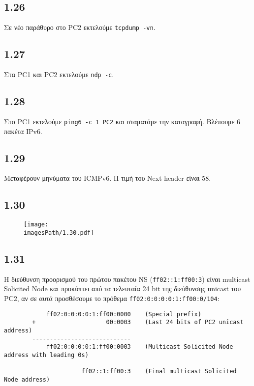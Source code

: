 \documentclass[a4paper, 12pt]{article}
\newcommand{\imagesPath}{.}
\begin{document}
	\subsection*{1.26}
		Σε νέο παράθυρο στο PC2 εκτελούμε \verb|tcpdump -vn|.

	\subsection*{1.27}
		Στα PC1 και PC2 εκτελούμε \verb|ndp -c|.

	\subsection*{1.28}
		Στο PC1 εκτελούμε \verb|ping6 -c 1 PC2| και σταματάμε την καταγραφή. Βλέπουμε 6 πακέτα IPv6.

	\subsection*{1.29}
		Μεταφέρουν μηνύματα του ICMPv6. Η τιμή του Next header είναι 58.

	\subsection*{1.30}
		\begin{figure}[H]
			\begin{center}
				\texttt{[image: \\imagesPath/1.30.pdf]}
			\end{center}
		\end{figure}

	\subsection*{1.31}
		Η διεύθυνση προορισμού του πρώτου πακέτου NS (\verb|ff02::1:ff00:3|) είναι multicast Solicited Node και προκύπτει από τα τελευταία 24 bit της διεύθυνσης unicast του PC2, αν σε αυτά προσθέσουμε το πρόθεμα \verb|ff02:0:0:0:0:1:ff00:0/104|:
		
		\begin{verbatim}
		    ff02:0:0:0:0:1:ff00:0000    (Special prefix)
		+                    00:0003    (Last 24 bits of PC2 unicast address)
		----------------------------
		    ff02:0:0:0:0:1:ff00:0003    (Multicast Solicited Node address with leading 0s)
		    
		              ff02::1:ff00:3    (Final multicast Solicited Node address)
		\end{verbatim}
\end{document}
